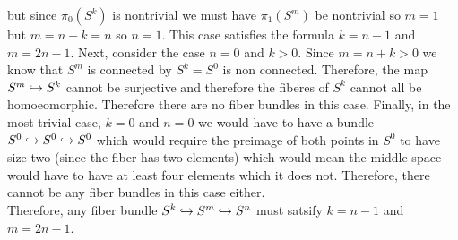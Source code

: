 \documentclass[12pt]{extarticle}
\begin{document}
but since $\pi_0(S^k)$ is nontrivial we must have $\pi_1(S^m)$ be nontrivial so $m = 1$ but $m = n + k = n$ so $n = 1$. This case satisfies the formula $k = n - 1$ and $m = 2 n - 1$. Next, consider the case $n = 0$ and $k > 0$. Since $m = n + k > 0$ we know that $S^m$ is connected by $S^k = S^0$ is non connected. Therefore, the map $S^m \hookrightarrow S^k$ cannot be surjective and therefore the fiberes of $S^k$ cannot all be homoeomorphic. Therefore there are no fiber bundles in this case. Finally, in the most trivial case, $k = 0$ and $n = 0$ we would have to have a bundle $S^0 \hookrightarrow S^0 \hookrightarrow S^0$ which would require the preimage of both points in $S^0$ to have size two (since the fiber has two elements) which would mean the middle space would have to have at least four elements which it does not. Therefore, there cannot be any fiber bundles in this case either. \bigskip\\
Therefore, any fiber bundle $S^k \hookrightarrow S^m \hookrightarrow S^n$ must satsify $k = n - 1$ and $m = 2n - 1$. 
\end{document}
